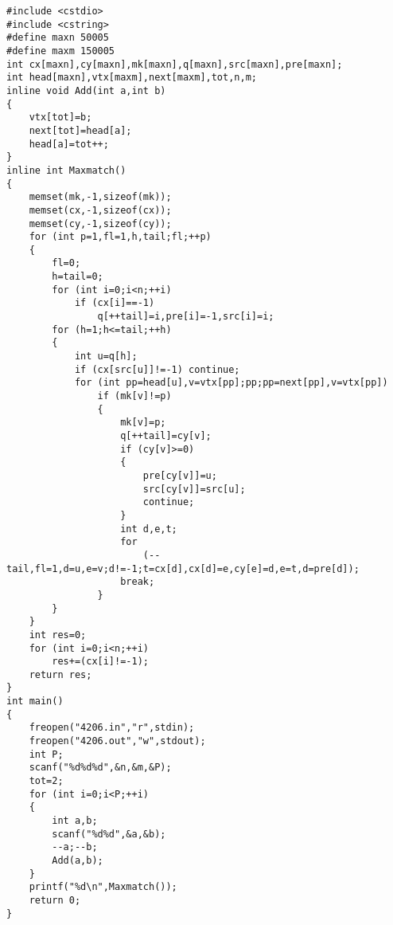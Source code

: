 \begin{lstlisting}
#include <cstdio>
#include <cstring>
#define maxn 50005
#define maxm 150005
int cx[maxn],cy[maxn],mk[maxn],q[maxn],src[maxn],pre[maxn];
int head[maxn],vtx[maxm],next[maxm],tot,n,m;
inline void Add(int a,int b)
{
	vtx[tot]=b;
	next[tot]=head[a];
	head[a]=tot++;
}
inline int Maxmatch()
{
	memset(mk,-1,sizeof(mk));
	memset(cx,-1,sizeof(cx));
	memset(cy,-1,sizeof(cy));
	for (int p=1,fl=1,h,tail;fl;++p)
	{
		fl=0;
		h=tail=0;
		for (int i=0;i<n;++i)
			if (cx[i]==-1)
				q[++tail]=i,pre[i]=-1,src[i]=i;
		for (h=1;h<=tail;++h)
		{
			int u=q[h];
			if (cx[src[u]]!=-1) continue;
			for (int pp=head[u],v=vtx[pp];pp;pp=next[pp],v=vtx[pp])
				if (mk[v]!=p)
				{
					mk[v]=p;
					q[++tail]=cy[v];
					if (cy[v]>=0)
					{
						pre[cy[v]]=u;
						src[cy[v]]=src[u];
						continue;
					}
					int d,e,t;
					for
						(--tail,fl=1,d=u,e=v;d!=-1;t=cx[d],cx[d]=e,cy[e]=d,e=t,d=pre[d]);
					break;
				}
		}
	}
	int res=0;
	for (int i=0;i<n;++i)
		res+=(cx[i]!=-1);
	return res;
}
int main()
{
	freopen("4206.in","r",stdin);
	freopen("4206.out","w",stdout);
	int P;
	scanf("%d%d%d",&n,&m,&P);
	tot=2;
	for (int i=0;i<P;++i)
	{
		int a,b;
		scanf("%d%d",&a,&b);
		--a;--b;
		Add(a,b);
	}
	printf("%d\n",Maxmatch());
	return 0;
}
\end{lstlisting}
